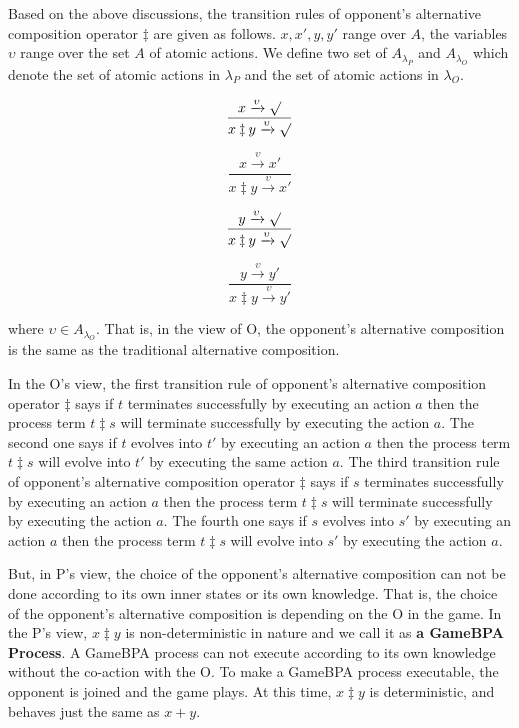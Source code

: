 \documentclass{fac}
\begin{document}
Based on the above discussions, the transition rules of opponent's alternative composition operator $\ddagger$ are given as follows. $x,x',y,y'$ range over $A$, the variables $\upsilon$ range over the set $A$ of atomic actions. We define two set of $A_{\lambda_P}$ and $A_{\lambda_O}$ which denote the set of atomic actions in $\lambda_{P}$ and the set of atomic actions in $\lambda_{O}$.

$$
\frac{x\xrightarrow{\upsilon}\surd}{x\ddagger y\xrightarrow{\upsilon}\surd}
$$

$$
\frac{x\xrightarrow{\upsilon}x'}{x\ddagger y\xrightarrow{\upsilon}x'}
$$

$$
\frac{y\xrightarrow{\upsilon}\surd}{x\ddagger y\xrightarrow{\upsilon}\surd}
$$

$$
\frac{y\xrightarrow{\upsilon}y'}{x\ddagger y\xrightarrow{\upsilon}y'}
$$

where $\upsilon\in A_{\lambda_O}$. That is, in the view of O, the opponent's alternative composition is the same as the traditional alternative composition.

In the O's view, the first transition rule of opponent's alternative composition operator $\ddagger$ says if $t$ terminates successfully by executing an action $a$ then the process term $t \ddagger s$ will terminate successfully by executing the action $a$. The second one says if $t$ evolves into $t'$ by executing an action $a$ then the process term $t \ddagger s$ will evolve into $t'$ by executing the same action $a$. The third transition rule of opponent's alternative composition operator $\ddagger$ says if $s$ terminates successfully by executing an action $a$ then the process term $t \ddagger s$ will terminate successfully by executing the action $a$. The fourth one says if $s$ evolves into $s'$ by executing an action $a$ then the process term $t \ddagger s$ will evolve into $s'$ by executing the action $a$.

But, in P's view, the choice of the opponent's alternative composition can not be done according to its own inner states or its own knowledge. That is, the choice of the opponent's alternative composition is depending on the O in the game. In the P's view, $x \ddagger y$ is non-deterministic in nature and we call it as \textbf{a GameBPA Process}. A GameBPA process can not execute according to its own knowledge without the co-action with the O. To make a GameBPA process executable, the opponent is joined and the game plays. At this time, $x \ddagger y$ is deterministic, and behaves just the same as $x + y$.
\end{document}
